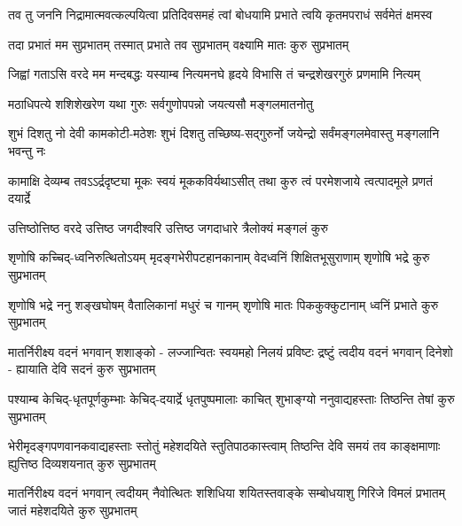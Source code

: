 

{तव तु जननि निद्रामात्मवत्कल्पयित्वा}
{प्रतिदिवसमहं त्वां बोधयामि प्रभाते}
{त्वयि कृतमपराधं सर्वमेतं क्षमस्व}

{तदा प्रभातं मम सुप्रभातम्}
{तस्मात् प्रभाते तव सुप्रभातम्}
{वक्ष्यामि मातः कुरु सुप्रभातम्}

{जिह्वां गताऽसि वरदे मम मन्दबद्धः}
{यस्याम्ब नित्यमनघे हृदये विभासि}
{तं चन्द्रशेखरगुरुं प्रणमामि नित्यम्}

{मठाधिपत्ये शशिशेखरेण}
{यथा गुरुः सर्वगुणोपपन्नो}
{जयत्यसौ मङ्गलमातनोतु}

{शुभं दिशतु नो देवी कामकोटी-मठेशः}
{शुभं दिशतु तच्छिष्य-सद्गुरुर्नो जयेन्द्रो}
{सर्वंमङ्गलमेवास्तु मङ्गलानि भवन्तु नः}

\fourlineindentedshloka
{कामाक्षि देव्यम्ब तवऽऽर्द्रदृष्ट्या}
{मूकः स्वयं मूककविर्यथाऽसीत्}
{तथा कुरु त्वं परमेशजाये}
{त्वत्पादमूले प्रणतं दयार्द्रे}

\twolineshloka
{उत्तिष्ठोत्तिष्ठ वरदे उत्तिष्ठ जगदीश्वरि}
{उत्तिष्ठ जगदाधारे त्रैलोक्यं मङ्गलं कुरु}

\fourlineindentedshloka
{शृणोषि कच्चिद्-ध्वनिरुत्थितोऽयम्}
{मृदङ्गभेरीपटहानकानाम्}
{वेदध्वनिं शिक्षितभूसुराणाम्}
{शृणोषि भद्रे कुरु सुप्रभातम्}

\fourlineindentedshloka
{शृणोषि भद्रे ननु शङ्खघोषम्}
{वैतालिकानां मधुरं च गानम्}
{शृणोषि मातः पिककुक्कुटानाम्}
{ध्वनिं प्रभाते कुरु सुप्रभातम्}

\fourlineindentedshloka
{मातर्निरीक्ष्य वदनं भगवान् शशाङ्को -}
{लज्जान्वितः स्वयमहो निलयं प्रविष्टः}
{द्रष्टुं त्वदीय वदनं भगवान् दिनेशो -}
{ह्यायाति देवि सदनं कुरु सुप्रभातम्}

\fourlineindentedshloka
{पश्याम्ब केचिद्-धृतपूर्णकुम्भाः}
{केचिद्-दयार्द्रे धृतपुष्पमालाः}
{काचित् शुभाङ्ग्यो ननुवाद्यहस्ताः}
{तिष्ठन्ति तेषां कुरु सुप्रभातम्}

\fourlineindentedshloka
{भेरीमृदङ्गपणवानकवाद्यहस्ताः}
{स्तोतुं महेशदयिते स्तुतिपाठकास्त्वाम्}
{तिष्ठन्ति देवि समयं तव काङ्क्षमाणाः}
{ह्युत्तिष्ठ दिव्यशयनात् कुरु सुप्रभातम्}

\fourlineindentedshloka
{मातर्निरीक्ष्य वदनं भगवान् त्वदीयम्}
{नैवोत्थितः शशिधिया शयितस्तवाङ्के}
{सम्बोधयाशु गिरिजे विमलं प्रभातम्}
{जातं महेशदयिते कुरु सुप्रभातम्}

